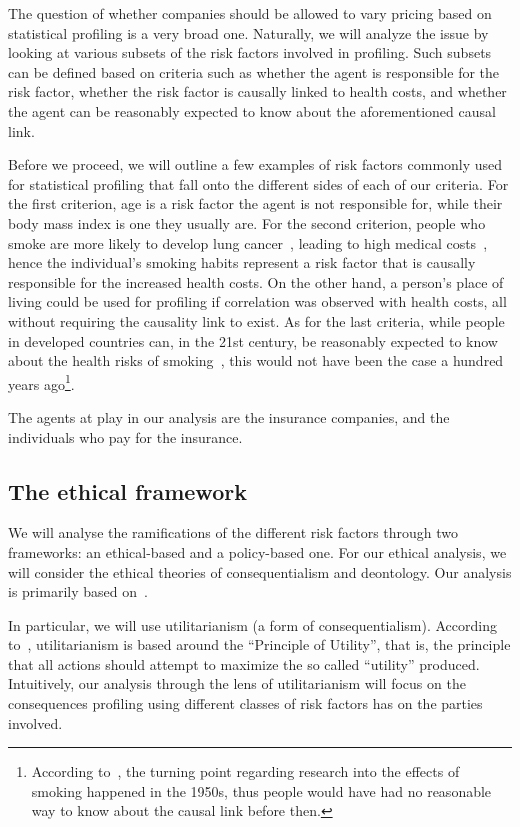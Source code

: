 The question of whether companies should be allowed to vary pricing based on statistical profiling is a very broad one. Naturally, we will analyze the issue by looking at various subsets of the risk factors involved in profiling. Such subsets can be defined based on criteria such as whether the agent is responsible for the risk factor, whether the risk factor is causally linked to health costs, and whether the agent can be reasonably expected to know about the aforementioned causal link.

Before we proceed, we will outline a few examples of risk factors commonly used for statistical profiling that fall onto the different sides of each of our criteria. For the first criterion, age is a risk factor the agent is not responsible for, while their body mass index is one they usually are. For the second criterion, people who smoke are more likely to develop lung cancer~\cite{effects-of-smoking}, leading to high medical costs~\cite{nl-lung-cancer-costs}, hence the individual's smoking habits represent a risk factor that is causally responsible for the increased health costs. On the other hand, a person's place of living could be used for profiling if correlation was observed with health costs, all without requiring the causality link to exist. As for the last criteria, while people in developed countries can, in the 21st century, be reasonably expected to know about the health risks of smoking~\cite{smoking-effect-knowledge}, this would not have been the case a hundred years ago\footnote{According to~\cite{smoking-in-the-50s}, the turning point regarding research into the effects of smoking happened in the 1950s, thus people would have had no reasonable way to know about the causal link before then.}.

The agents at play in our analysis are the insurance companies, and the individuals who pay for the insurance.

\subsection{The ethical framework}
We will analyse the ramifications of the different risk factors through two frameworks: an ethical-based and a policy-based one. For our ethical analysis, we will consider the ethical theories of consequentialism and deontology. Our analysis is primarily based on~\cite{odihi20}.

In particular, we will use utilitarianism (a form of consequentialism). According to~\cite[Chapter~7]{elemofmp}, utilitarianism is based around the ``Principle of Utility'', that is, the principle that all actions should attempt to maximize the so called ``utility'' produced. Intuitively, our analysis through the lens of utilitarianism will focus on the consequences profiling using different classes of risk factors has on the parties involved.

